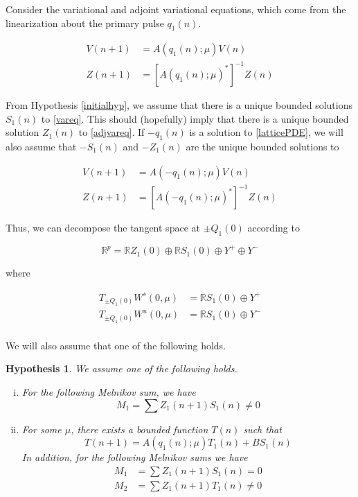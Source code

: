 \documentclass[12pt]{article}
\def\R{{\mathbb R}}
\newtheorem{hypothesis}{Hypothesis}
\begin{document}
Consider the variational and adjoint variational equations, which come from the linearization about the primary pulse $q_1(n)$.

\begin{align}
V(n+1) &= A(q_1(n); \mu) V(n) \label{vareq} \\
Z(n+1) &= [A(q_1(n); \mu)^*]^{-1} Z(n) \label{adjvareq}
\end{align}

From Hypothesis \ref{initialhyp}, we assume that there is a unique bounded solutions $S_1(n)$ to \eqref{vareq}. This should (hopefully) imply that there is a unique bounded solution $Z_1(n)$ to \eqref{adjvareq}. If $-q_1(n)$ is a solution to \eqref{latticePDE}, we will also assume that $-S_1(n)$ and $-Z_1(n)$ are the unique bounded solutions to 

\begin{align}
V(n+1) &= A(-q_1(n); \mu) V(n) \label{minusvareq} \\
Z(n+1) &= [A(-q_1(n); \mu)^*]^{-1} Z(n) \label{minusadjvareq}
\end{align}

Thus, we can decompose the tangent space at $\pm Q_1(0)$ according to

\begin{equation}\label{tangentdecomp}
\R^p = \R Z_1(0) \oplus \R S_1(0) \oplus Y^+ \oplus Y^-
\end{equation}

where 

\begin{align*}
T_{\pm Q_1(0)}W^s(0, \mu) &= \R S_1(0) \oplus Y^+ \\
T_{\pm Q_1(0)}W^u(0, \mu) &= \R S_1(0) \oplus Y^- \\
\end{align*}

We will also assume that one of the following holds.

\begin{hypothesis}\label{melnikovhyp}
We assume one of the following holds.
\begin{enumerate}[(i)]
\item For the following Melnikov sum, we have
\[
M_1 = \sum Z_1(n+1) S_1(n) \neq 0
\]
\item For some $\mu$, there exists a bounded function $T(n)$ such that 
\[
T(n+1) = A(q_1(n); \mu) T_1(n) + B S_1(n)
\]
In addition, for the following Melnikov sums we have
\begin{align*}
M_1 &= \sum Z_1(n+1) S_1(n) = 0 \\
M_2 &= \sum Z_1(n+1) T_1(n) \neq 0 
\end{align*}
\end{enumerate}
\end{hypothesis}
\end{document}
